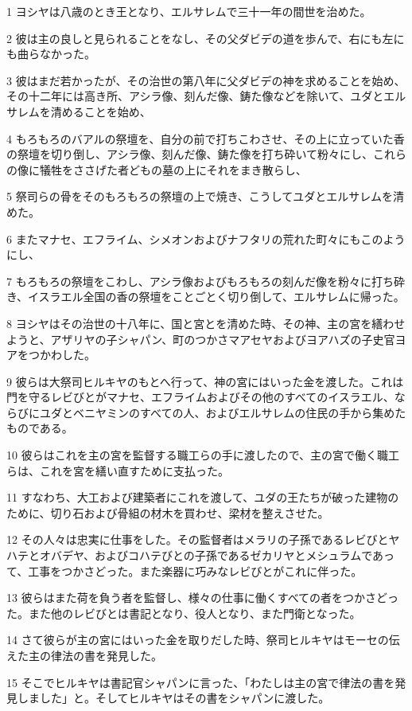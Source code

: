 \par 1 ヨシヤは八歳のとき王となり、エルサレムで三十一年の間世を治めた。
\par 2 彼は主の良しと見られることをなし、その父ダビデの道を歩んで、右にも左にも曲らなかった。
\par 3 彼はまだ若かったが、その治世の第八年に父ダビデの神を求めることを始め、その十二年には高き所、アシラ像、刻んだ像、鋳た像などを除いて、ユダとエルサレムを清めることを始め、
\par 4 もろもろのバアルの祭壇を、自分の前で打ちこわさせ、その上に立っていた香の祭壇を切り倒し、アシラ像、刻んだ像、鋳た像を打ち砕いて粉々にし、これらの像に犠牲をささげた者どもの墓の上にそれをまき散らし、
\par 5 祭司らの骨をそのもろもろの祭壇の上で焼き、こうしてユダとエルサレムを清めた。
\par 6 またマナセ、エフライム、シメオンおよびナフタリの荒れた町々にもこのようにし、
\par 7 もろもろの祭壇をこわし、アシラ像およびもろもろの刻んだ像を粉々に打ち砕き、イスラエル全国の香の祭壇をことごとく切り倒して、エルサレムに帰った。
\par 8 ヨシヤはその治世の十八年に、国と宮とを清めた時、その神、主の宮を繕わせようと、アザリヤの子シャパン、町のつかさマアセヤおよびヨアハズの子史官ヨアをつかわした。
\par 9 彼らは大祭司ヒルキヤのもとへ行って、神の宮にはいった金を渡した。これは門を守るレビびとがマナセ、エフライムおよびその他のすべてのイスラエル、ならびにユダとベニヤミンのすべての人、およびエルサレムの住民の手から集めたものである。
\par 10 彼らはこれを主の宮を監督する職工らの手に渡したので、主の宮で働く職工らは、これを宮を繕い直すために支払った。
\par 11 すなわち、大工および建築者にこれを渡して、ユダの王たちが破った建物のために、切り石および骨組の材木を買わせ、梁材を整えさせた。
\par 12 その人々は忠実に仕事をした。その監督者はメラリの子孫であるレビびとヤハテとオバデヤ、およびコハテびとの子孫であるゼカリヤとメシュラムであって、工事をつかさどった。また楽器に巧みなレビびとがこれに伴った。
\par 13 彼らはまた荷を負う者を監督し、様々の仕事に働くすべての者をつかさどった。また他のレビびとは書記となり、役人となり、また門衛となった。
\par 14 さて彼らが主の宮にはいった金を取りだした時、祭司ヒルキヤはモーセの伝えた主の律法の書を発見した。
\par 15 そこでヒルキヤは書記官シャパンに言った、「わたしは主の宮で律法の書を発見しました」と。そしてヒルキヤはその書をシャパンに渡した。

